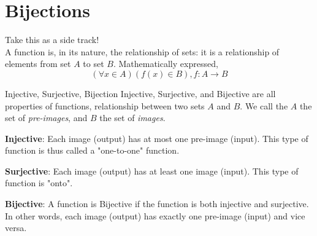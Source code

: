 \section{Bijections}
Take this as a side track! \\
A function is, in its nature, the relationship of sets: it is a relationship of elements from set $A$ to set $B$. Mathematically expressed, \\
\[(\forall x \in A) (f(x) \in B), f : A \rightarrow B\]
\begin{ln-define}{Injective, Surjective, Bijection}{}
    Injective, Surjective, and Bijective are all properties of functions, relationship between two sets $A$ and $B$. We call the $A$ the set of \textit{pre-images}, and $B$ the set of \textit{images}.
    \begin{bindenum}
        \item{
            \textbf{Injective}: Each image (output) has at most one pre-image (input). This type of function is thus called a "one-to-one" function.
            \begin{center}
            \end{center}
        }
        \item{
            \textbf{Surjective}: Each image (output) has at least one image (input). This type of function is "onto".
            \begin{center}
            \end{center}
        }
        \item {
            \textbf{Bijective}: A function is Bijective if the function is both injective and surjective. In other words, each image (output) has exactly one pre-image (input) and vice versa.
        }
    \end{bindenum}
\end{ln-define}
